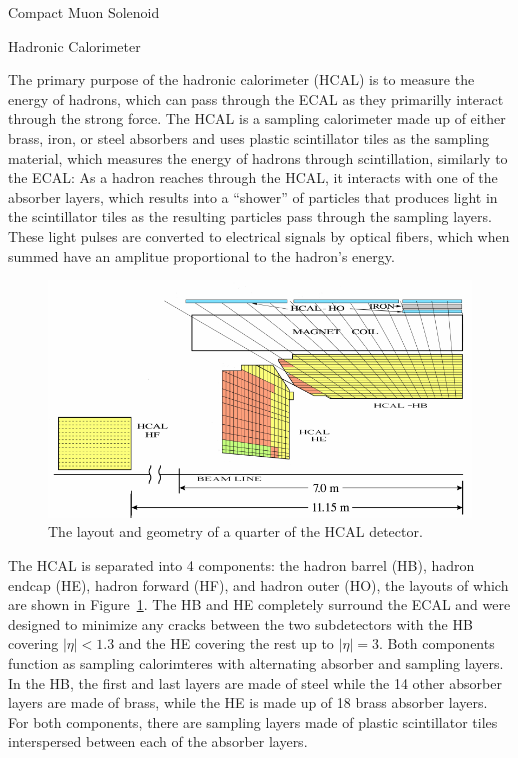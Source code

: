 \begin{section}{Compact Muon Solenoid}
\begin{subsection}{Hadronic Calorimeter}

The primary purpose of the hadronic calorimeter (HCAL) is to measure the energy of hadrons, which can pass through the ECAL as they primarilly interact through the strong force.
The HCAL is a sampling calorimeter made up of either brass, iron, or steel absorbers and uses plastic scintillator tiles as the sampling material, which measures the energy of hadrons through scintillation, similarly to the ECAL:
As a hadron reaches through the HCAL, it interacts with one of the absorber layers, which results into a ``shower'' of particles that produces light in the scintillator tiles as the resulting particles pass through the sampling layers.
These light pulses are converted to electrical signals by optical fibers, which when summed have an amplitue proportional to the hadron's energy. 

\begin{figure}[tbp!]
\begin{center}
\includegraphics[angle=0,width=0.80\columnwidth]{fig/cms_hcal.png}
\end{center}
\caption{The layout and geometry of a quarter of the HCAL detector.}
\label{fig:cms_hcal}
\end{figure}

The HCAL is separated into 4 components: the hadron barrel (HB), hadron endcap (HE), hadron forward (HF), and hadron outer (HO), the layouts of which are shown in Figure~\ref{fig:cms_hcal}.
The HB and HE completely surround the ECAL and were designed to minimize any cracks between the two subdetectors with the HB covering $|\eta|<1.3$ and the HE covering the rest up to $|\eta|=3$.
Both components function as sampling calorimteres with alternating absorber and sampling layers.
In the HB, the first and last layers are made of steel while the 14 other absorber layers are made of brass, while the HE is made up of 18 brass absorber layers.
For both components, there are sampling layers made of plastic scintillator tiles interspersed between each of the absorber layers.


\end{subsection}
\end{section}
